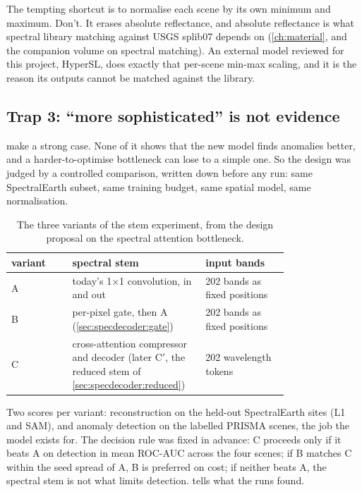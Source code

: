 The tempting shortcut is to normalise each scene by its own minimum and maximum. Don't. It erases absolute reflectance, and absolute reflectance is what spectral library matching against USGS splib07 depends on (\cref{ch:material}, and the companion volume on spectral matching). An external model reviewed for this project, HyperSL, does exactly that per-scene min-max scaling, and it is the reason its outputs cannot be matched against the library.

\subsection{Trap 3: ``more sophisticated'' is not evidence}

 make a strong case. None of it shows that the new model finds anomalies better, and a harder-to-optimise bottleneck can lose to a simple one. So the design was judged by a controlled comparison, written down before any run: same SpectralEarth subset, same training budget, same spatial model, same normalisation.

\begin{table}[htbp]\centering
\caption{The three variants of the stem experiment, from the design proposal on the spectral attention bottleneck.}\label{tab:specdecoder:variants}
\begin{tabular}{lp{0.48\linewidth}p{0.3\linewidth}}\toprule
variant & spectral stem & input bands\\\midrule
A & today's 1$\times$1 convolution, in and out & 202 bands as fixed positions\\
B & per-pixel gate, then A (\cref{sec:specdecoder:gate}) & 202 bands as fixed positions\\
C & cross-attention compressor and decoder (later C$'$, the reduced stem of \cref{sec:specdecoder:reduced}) & 202 wavelength tokens\\\bottomrule
\end{tabular}
\end{table}

Two scores per variant: reconstruction on the held-out SpectralEarth sites (L1 and SAM), and anomaly detection on the labelled PRISMA scenes, the job the model exists for. The decision rule was fixed in advance: C proceeds only if it beats A on detection in mean ROC-AUC across the four scenes; if B matches C within the seed spread of A, B is preferred on cost; if neither beats A, the spectral stem is not what limits detection.  tells what the runs found.

